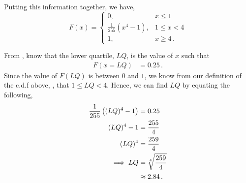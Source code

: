 \begin{subquestions}
\begin{subsubquestions}
Putting this information together, we have,
\begin{equation}
F(x) = \begin{cases} 
	0 , & x\leq 1 \\
	\frac{1}{255}\left(x^4 - 1 \right), & 1 \leq x < 4 \\
	1, & x \geq 4 \,. \label{eq:2005:q3:CDF}
\end{cases}
\end{equation}


\subsubquestion

From , know that the lower quartile, $LQ$, is the value of $x$ such that
\begin{align}
	F(x =LQ) & = 0.25 \,.
\end{align}
Since the value of $F(LQ)$ is between $0$ and $1$, we know from our definition of the c.d.f above, , that $1 \leq LQ < 4$. Hence, we can find $LQ$ by equating the following,
\begin{align}
	\frac{1}{255}\left((LQ)^4 - 1 \right) & = 0.25 \nonumber \\
	 (LQ)^4 - 1 & = \frac{255}{4} \nonumber \\
	(LQ)^4 & = \frac{259}{4} \nonumber \\
	\implies LQ & = \sqrt[4]{\frac{259}{4}} \nonumber \\
	           & \approx 2.84 \,. 
\end{align}	

\end{subsubquestions}
	
\end{subquestions}
